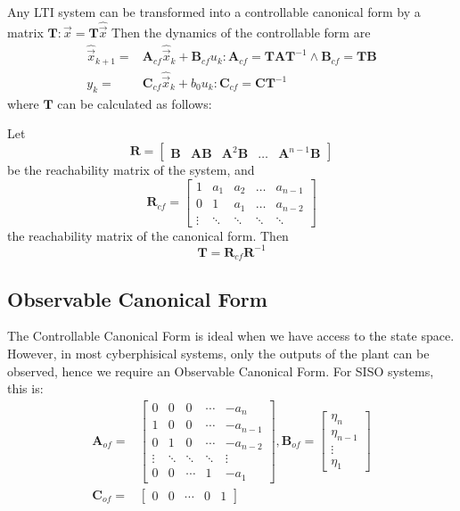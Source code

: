 \documentclass[runningheads,a4paper]{llncs}
\newcommand{\mat}[1]{\boldsymbol{#1}}
\begin{document}
Any LTI system can be transformed into a controllable canonical form by a matrix $\mat{T} : \vec{x}=\mat{T}\hat{\vec{x}}$
Then the dynamics of the controllable form are
\begin{align}
\hat{\vec{x}}_{k+1}=&\mat{A}_{cf}\hat{\vec{x}}_k+\mat{B}_{cf}u_k : \mat{A}_{cf}=\mat{T}\mat{A}\mat{T}^{-1} \wedge \mat{B}_{cf}=\mat{T}\mat{B}\\
y_k=&\mat{C}_{cf}\hat{\vec{x}}_k + b_0u_k : \mat{C}_{cf}=\mat{C}\mat{T}^{-1}\nonumber
\end{align}
where $\mat{T}$ can be calculated as follows:

Let 
\begin{equation}
\mat{R}=[\begin{array}{ccccc}\mat{B}&\mat{A}\mat{B}&\mat{A}^2\mat{B}&\hdots&\mat{A}^{n-1}\mat{B}\end{array}]
\label{eq:rncf}
\end{equation}
be the reachability matrix of the system, and
\begin{equation}
\mat{R}_{cf}=\left[\begin{array}{ccccc}1&a_1&a_2&\hdots&a_{n-1}\\0&1&a_1&\hdots&a_{n-2}\\ \vdots&\ddots&\ddots&\ddots&\ddots\end{array}\right]
\label{eq:rcf}
\end{equation}
the reachability matrix of the canonical form. Then 
\begin{equation}
\mat{T}=\mat{R}_{cf}\mat{R}^{-1}
\label{eq:to_cf}
\end{equation}

\subsection{Observable Canonical Form} \label{sec:observable}
The Controllable Canonical Form is ideal when we have access to the state space. However, in most cyberphisical
systems, only the outputs of the plant can be observed, hence we require an Observable Canonical Form.
For SISO systems, this is:
\begin{align}
\label{of_SISO}
\mat{A}_{of}=&\left[
\begin{array}{ccccc}
0&0&0&\cdots&-a_n\\
1&0&0&\cdots&-a_{n-1}\\
0&1&0&\cdots&-a_{n-2}\\
\vdots&\ddots&\ddots&\ddots&\vdots\\
0&0&\cdots&1&-a_1
\end{array}\right],
\mat{B}_{of}=\left[
\begin{array}{c}
\eta_n\\ \eta_{n-1}\\ \vdots\\ \eta_1
\end{array}\right]\\
\mat{C}_{of}=&[\begin{array}{ccccc}0&0&\cdots&0&1\end{array}] \nonumber
\end{align}
\end{document}
